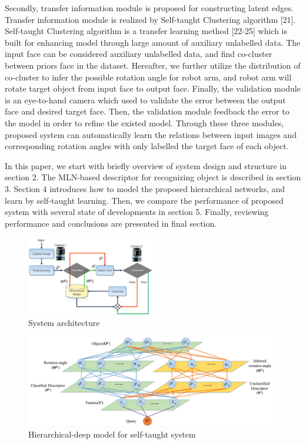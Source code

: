 \documentclass[journal]{IEEEtran}
\begin{document}
Secondly, transfer information module is proposed for constructing latent edges. Transfer information module is realized by Self-taught Clustering algorithm [21]. Self-taught Clustering algorithm is a transfer learning method [22-25] which is built for enhancing model through large amount of auxiliary unlabelled data. The input face can be considered auxiliary unlabelled data, and find co-cluster between priors face in the dataset. Hereafter, we further utilize the distribution of co-cluster to infer the possible rotation angle for robot arm, and robot arm will rotate target object from input face to output face. Finally, the validation module is an eye-to-hand camera which used to validate the error between the output face and desired target face. Then, the validation module feedback the error to the model in order to refine the existed model. Through these three modules, proposed system can automatically learn the relations between input images and corresponding rotation angles with only labelled the target face of each object.

In this paper, we start with briefly overview of system design and structure in section 2. The MLN-based descriptor for recognizing object is described in section 3. Section 4 introduces how to model the proposed hierarchical networks, and learn by self-taught learning. Then, we compare the performance of proposed system with several state of developments in section 5. Finally, reviewing performance and conclusions are presented in final section.

\begin{figure}[!t]
\begin{center}
\includegraphics[width=0.5\textwidth]{j_img/fig1.jpg}
\caption{System architecture}\label{test}
\end{center}
\end{figure}

\begin{figure}[!t]
\begin{center}
\includegraphics*[width=7 in]{j_img/fig3.jpg}
\caption{Hierarchical-deep model for self-taught system}\label{test}
\end{center}
\end{figure}
\end{document}
